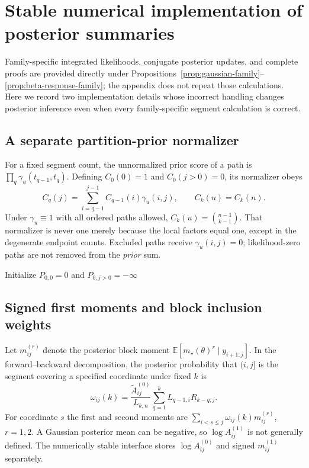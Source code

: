 \section{Stable numerical implementation of posterior summaries}
\label{app:numerical-summaries}
Family-specific integrated likelihoods, conjugate posterior updates, and complete proofs are provided directly under Propositions~\ref{prop:gaussian-family}--\ref{prop:beta-response-family}; the appendix does not repeat those calculations. Here we record two implementation details whose incorrect handling changes posterior inference even when every family-specific segment calculation is correct.

\subsection{A separate partition-prior normalizer}
For a fixed segment count, the unnormalized prior score of a path is $\prod_q\gamma_u(t_{q-1},t_q)$. Defining $C_0(0)=1$ and $C_0(j>0)=0$, its normalizer obeys
\begin{equation}
C_q(j)=\sum_{i=q-1}^{j-1}C_{q-1}(i)\gamma_u(i,j),
\qquad C_k(u)=C_k(n).
\label{eq:prior-normalizer-recurrence}
\end{equation}
Under $\gamma_u\equiv1$ with all ordered paths allowed, $C_k(u)=\binom{n-1}{k-1}$. That normalizer is never one merely because the local factors equal one, except in the degenerate endpoint counts. Excluded paths receive $\gamma_u(i,j)=0$; likelihood-zero paths are not removed from the \emph{prior} sum.

\begin{algorithm}[H]
\caption{Log-space normalization of a factorized partition prior}
\label{alg:partition-prior-normalizer}
Initialize $P_{0,0}=0$ and $P_{0,j>0}=-\infty$\;
\end{algorithm}

\subsection{Signed first moments and block inclusion weights}
Let $m^{(r)}_{ij}$ denote the posterior block moment $\mathbb E[m_\star(\theta)^r\mid y_{i+1:j}]$. In the forward--backward decomposition, the posterior probability that $(i,j]$ is the segment covering a specified coordinate under fixed $k$ is
\begin{equation}
\omega_{ij}(k)=\frac{\widetilde A_{ij}^{(0)}}{L_{k,n}}
\sum_{q=1}^{k}L_{q-1,i}R_{k-q,j}.
\label{eq:block-inclusion-weight}
\end{equation}
For coordinate $s$ the first and second moments are $\sum_{i<s\le j}\omega_{ij}(k)m^{(r)}_{ij}$, $r=1,2$. A Gaussian posterior mean can be negative, so $\log A^{(1)}_{ij}$ is not generally defined. The numerically stable interface stores $\log A^{(0)}_{ij}$ and signed $m^{(1)}_{ij}$ separately.

